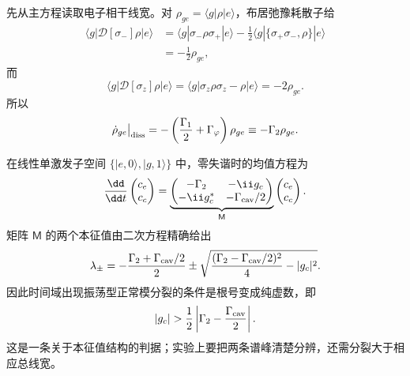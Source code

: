 \begin{derivation}[开放单模耦合的线宽与协作参数]
先从主方程读取电子相干线宽。对 $\rho_{ge}=\langle g|\rho|e\rangle$，布居弛豫耗散子给
\begin{align*}
\langle g|\mathcal D[\sigma_-]\rho|e\rangle
&=\langle g|\sigma_-\rho\sigma_+|e\rangle
-\frac12\langle g|\{\sigma_+\sigma_-,\rho\}|e\rangle\\
&=-\frac12\rho_{ge},
\end{align*}
而
\begin{equation*}
\langle g|\mathcal D[\sigma_z]\rho|e\rangle
=\langle g|\sigma_z\rho\sigma_z-\rho|e\rangle
=-2\rho_{ge}.
\end{equation*}
所以
\begin{equation*}
\dot\rho_{ge}\big|_{\rm diss}
=-\left(\frac{\Gamma_1}{2}+\Gamma_\varphi\right)\rho_{ge}
\equiv-\Gamma_2\rho_{ge}.
\end{equation*}

在线性单激发子空间 $\{|e,0\rangle,|g,1\rangle\}$ 中，零失谐时的均值方程为
\begin{equation*}
\frac{\dd}{\dd t}
\begin{pmatrix}c_e\\c_c\end{pmatrix}
=
\underbrace{\begin{pmatrix}
-\Gamma_2&-\ii g_c\\
-\ii g_c^*&-\Gamma_{\rm cav}/2
\end{pmatrix}}_{\mathsf M}
\begin{pmatrix}c_e\\c_c\end{pmatrix}.
\end{equation*}
矩阵 $\mathsf M$ 的两个本征值由二次方程精确给出
\begin{equation*}
\lambda_\pm
=-\frac{\Gamma_2+\Gamma_{\rm cav}/2}{2}
\pm
\sqrt{
\frac{(\Gamma_2-\Gamma_{\rm cav}/2)^2}{4}
-|g_c|^2}.
\end{equation*}
因此时间域出现振荡型正常模分裂的条件是根号变成纯虚数，即
\begin{equation*}
|g_c|>
\frac12\left|\Gamma_2-\frac{\Gamma_{\rm cav}}{2}\right|.
\end{equation*}
这是一条关于本征值结构的判据；实验上要把两条谱峰清楚分辨，还需分裂大于相应总线宽。


\end{derivation}
